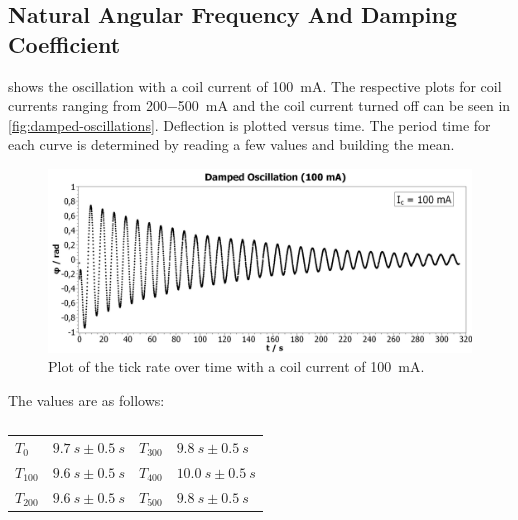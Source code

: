     \subsection{Natural Angular Frequency And Damping Coefficient}
         shows the oscillation with a coil current of \SI{100}{mA}. The respective plots
        for coil currents ranging from \SI{200-500}{mA} and the coil current turned off can be seen in \cref{fig:damped-oscillations}.
        Deflection is plotted versus time. The period time for each curve is determined by reading a few values and building the mean.\par
        \begin{figure}[H]%
            \centering
            \includegraphics[width=1\linewidth]{"messdaten/Damped Oscillation (100mA)"}
            \caption[Course of the tick rate at $ I_{c}=\SI{100}{mA} $]{Plot of the tick rate over time with a coil current of \SI{100}{mA}.}
            \label{fig:damped-oscillation-100mA}
        \end{figure}
        The values are as follows:\par
        \begin{table}[h]
            \centering
            \caption[Period times for the damped oscillations]{}
            \begin{tabular}{@{}llll@{}}
                \toprule
                \( T_0 \)       &$\SI{9.7}{s} \pm \SI{0.5}{s}$    &\hspace{10mm}\(T_{300}\)      &$\SI{9.8}{s} \pm \SI{0.5}{s}$\\
                \( T_{100} \)   &$\SI{9.6}{s} \pm \SI{0.5}{s}$    &\hspace{10mm}\(T_{400}\)      &$\SI{10.0}{s} \pm \SI{0.5}{s}$\\
                \(T_{200}\)     &$\SI{9.6}{s} \pm \SI{0.5}{s}$    &\hspace{10mm}\(T_{500}\)      &$\SI{9.8}{s} \pm \SI{0.5}{s}$\\
                \bottomrule
            \end{tabular}
            \label{tab:period_times_damped_oscillations}
        \end{table}
